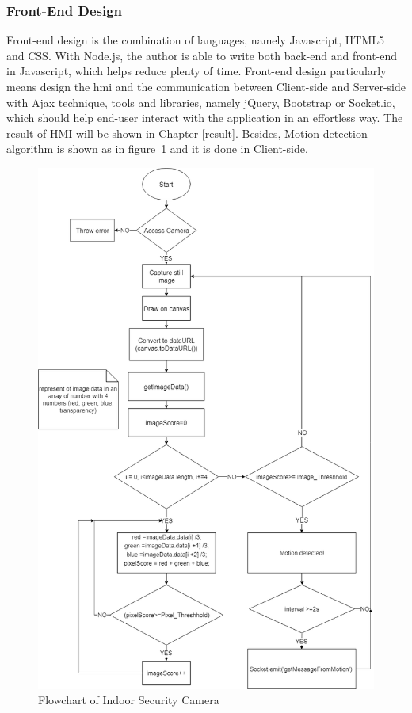         \newpage
        \subsubsection{Front-End Design}
        Front-end design is the combination of languages, namely Javascript, HTML5 and CSS. With Node.js, the author is able to write both back-end and front-end in Javascript, which helps reduce plenty of time. Front-end design particularly means design the \gls{hmi} and the communication between Client-side and Server-side with Ajax technique, tools and libraries, namely jQuery, Bootstrap or Socket.io, which should help end-user interact with the application in an effortless way. The result of HMI will be shown in Chapter \ref{result}. Besides, Motion detection algorithm is shown as in figure~\ref{fig:motionFlow} and it is done in Client-side.
        \begin{figure}[!h]
            \begin{center}
            \includegraphics[scale=0.45]{images/motionFlow.png}
            \caption{Flowchart of Indoor Security Camera}
            \label{fig:motionFlow}
            \end{center}
        \end{figure}

